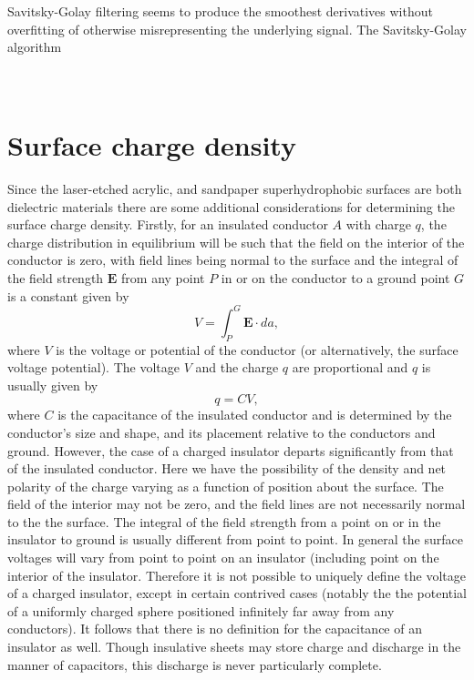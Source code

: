 \documentclass[a4paper, 12pt]{article}
\begin{document}

Savitsky-Golay filtering seems to produce the smoothest derivatives without overfitting of otherwise misrepresenting the underlying signal. The Savitsky-Golay algorithm


\section{\\Surface charge density}\label{sec.surface_charge}
Since the laser-etched acrylic, and sandpaper superhydrophobic surfaces are both dielectric materials there are some additional considerations for determining the surface charge density. Firstly, for an insulated conductor $A$ with charge $q$, the charge distribution in equilibrium will be such that the field on the interior of the conductor is zero, with field lines being normal to the surface and the integral of the field strength $\mathbf{E}$ from any point $P$ in or on the conductor to a ground point $G$ is a constant given by
\[ V = \int^G_P \mathbf{E} \cdot da, \]
where $V$ is the voltage or potential of the conductor (or alternatively, the surface voltage potential). The voltage $V$ and the charge $q$ are proportional and $q$ is usually given by
\[q = CV, \]
where $C$ is the capacitance of the insulated conductor and is determined by the conductor's size and shape, and its placement relative to the conductors and ground. However, the case of a charged insulator departs significantly from that of the insulated conductor. Here we have the possibility of the density and net polarity of the charge varying as a function of position about the surface. The field of the interior may not be zero, and the field lines are not necessarily normal to the the surface. The integral of the field strength from a point on or in the insulator to ground is usually different from point to point. In general the surface voltages will vary from point to point on an insulator (including point on the interior of the insulator. Therefore it is not possible to uniquely define the voltage of a charged insulator, except in certain contrived cases (notably the the potential of a uniformly charged sphere positioned infinitely far away from any conductors). It follows that there is no definition for the capacitance of an insulator as well. Though insulative sheets may store charge and discharge in the manner of capacitors, this discharge is never particularly complete.
\end{document}
